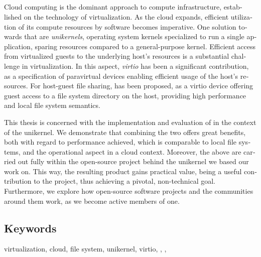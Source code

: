 \begin{otherlanguage}{english}
	\chapter*{\abstractname}

	Cloud computing is the dominant approach to compute infrastructure,
	established on the technology of virtualization. As the cloud expands,
	efficient utilization of its compute resources by software becomes
	imperative. One solution towards that are \emph{unikernels}, operating
	system kernels specialized to run a single application, sparing resources
	compared to a general-purpose kernel. Efficient access from virtualized
	guests to the underlying host's resources is a substantial challenge in
	virtualization. In this aspect, \emph{virtio} has been a significant
	contribution, as a specification of paravirtual devices enabling efficient
	usage of the host's resources. For host-guest file sharing, \emph{\viofs{}}
	has been proposed, as a virtio device offering guest access to a file system
	directory on the host, providing high performance and local file system
	semantics.

	This thesis is concerned with the implementation and evaluation of \viofs{}
	in the context of the \osv unikernel. We demonstrate that combining the two
	offers great benefits, both with regard to performance achieved, which
	is comparable to local file systems, and the operational aspect in a cloud
	context. Moreover, the above are carried out fully within the open-source
	project behind the unikernel we based our work on. This way, the resulting
	product gains practical value, being a useful contribution to the project,
	thus achieving a pivotal, non-technical goal. Furthermore, we explore how
	open-source software projects and the communities around them work, as we
	become active members of one.

	\section*{Keywords}

	\noindent
	virtualization, cloud, file system, unikernel, virtio, \osv{}, \viofs{},
	\qemu{}
\end{otherlanguage}
